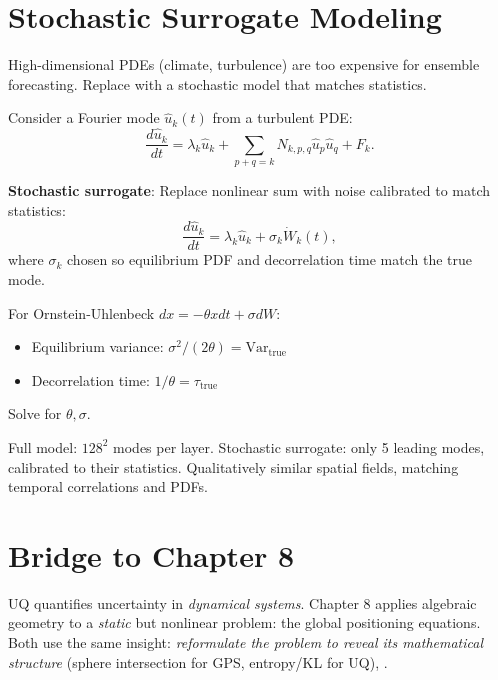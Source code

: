 \section{Stochastic Surrogate Modeling}
\label{sec:uq:surrogate}

High-dimensional PDEs (climate, turbulence) are too expensive for ensemble forecasting. Replace with a stochastic model that matches statistics.

Consider a Fourier mode $\hat{u}_k(t)$ from a turbulent PDE:
\[
\frac{d\hat{u}_k}{dt} = \lambda_k \hat{u}_k + \sum_{p+q=k} N_{k,p,q} \hat{u}_p \hat{u}_q + F_k.
\]

\textbf{Stochastic surrogate}: Replace nonlinear sum with noise calibrated to match statistics:
\[
\frac{d\hat{u}_k}{dt} = \lambda_k \hat{u}_k + \sigma_k \dot{W}_k(t),
\]
where $\sigma_k$ chosen so equilibrium PDF and decorrelation time match the true mode.

\begin{theorem}[Calibration]
For Ornstein-Uhlenbeck $dx = -\theta x dt + \sigma dW$:
\begin{itemize}
    \item Equilibrium variance: $\sigma^2 / (2\theta) = \mathrm{Var}_{\text{true}}$
    \item Decorrelation time: $1/\theta = \tau_{\text{true}}$
\end{itemize}
Solve for $\theta, \sigma$.
\end{theorem}

\begin{example}
Full model: $128^2$ modes per layer. Stochastic surrogate: only 5 leading modes, calibrated to their statistics. Qualitatively similar spatial fields, matching temporal correlations and PDFs.
\end{example}

\section{Bridge to Chapter 8}
\label{sec:uq:bridge}

UQ quantifies uncertainty in \emph{dynamical systems}. Chapter 8 applies algebraic geometry to a \emph{static} but nonlinear problem: the global positioning equations. Both use the same insight: \emph{reformulate the problem to reveal its mathematical structure} (sphere intersection for GPS, entropy/KL for UQ), \cite{chen2025uq}.

